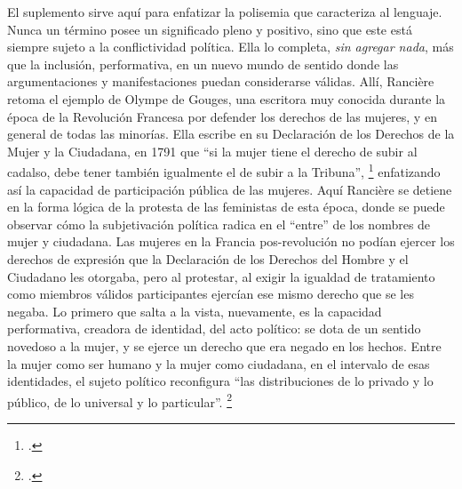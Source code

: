 El suplemento sirve aquí para enfatizar la polisemia que caracteriza al lenguaje. Nunca un término posee un significado pleno y positivo, sino que este está siempre sujeto a la conflictividad política. Ella lo completa, \emph{sin agregar nada}, más que la inclusión, performativa, en un nuevo mundo de sentido donde las argumentaciones y manifestaciones puedan considerarse válidas. Allí, Rancière retoma el ejemplo de Olympe de Gouges, una escritora muy conocida durante la época de la Revolución Francesa por defender los derechos de las mujeres, y en general de todas las minorías. Ella escribe en su Declaración de los Derechos de la Mujer y la Ciudadana, en 1791 que \enquote{si la mujer tiene el derecho de subir al cadalso, debe tener también igualmente el de subir a la Tribuna}, \footcite[][87]{@7066-RANCIERE2007} enfatizando así la capacidad de participación pública de las mujeres. Aquí Rancière se detiene en la forma lógica de la protesta de las feministas de esta época, donde se puede observar cómo la subjetivación política radica en el \enquote{entre} de los nombres de mujer y ciudadana. Las mujeres en la Francia pos-revolución no podían ejercer los derechos de expresión que la Declaración de los Derechos del Hombre y el Ciudadano les otorgaba, pero al protestar, al exigir la igualdad de tratamiento como miembros válidos participantes ejercían ese mismo derecho que se les negaba. Lo primero que salta a la vista, nuevamente, es la capacidad performativa, creadora de identidad, del acto político: se dota de un sentido novedoso a la mujer, y se ejerce un derecho que era negado en los hechos. Entre la mujer como ser humano y la mujer como ciudadana, en el intervalo de esas identidades, el sujeto político reconfigura \enquote{las distribuciones de lo privado y lo público, de lo universal y lo particular}. \footcite[][89]{@7066-RANCIERE2007}

